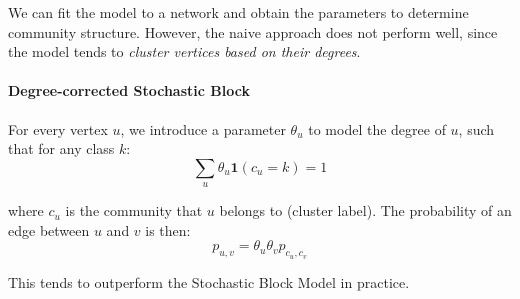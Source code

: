 \documentclass{article}
\begin{document}
We can fit the model to a network and obtain the parameters to determine community structure. However, the naive approach does not perform well, since the model tends to \textit{cluster vertices based on their degrees}.

\paragraph{Degree-corrected Stochastic Block} For every vertex $u$, we introduce a parameter $\theta_u$ to model the degree of $u$, such that for any class $k$:
\begin{equation*}
    \sum_{u}\theta_{u}\mathbf{1}(c_{u}=k)=1
\end{equation*}

where $c_u$ is the community that $u$ belongs to (cluster label). The probability of an edge between $u$ and $v$ is then:
\begin{equation*}
    p_{u,v}=\theta_{u}\theta_{v}p_{c_{u},c_{v}}
\end{equation*}

This tends to outperform the Stochastic Block Model in practice.  

\newpage


\end{document}
